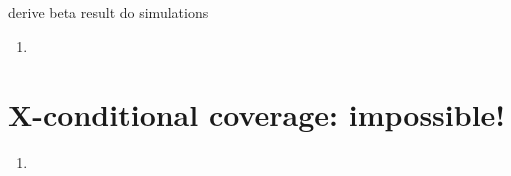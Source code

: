\documentclass{article}
\begin{document}
derive beta result do simulations

\begin{enumerate}[label=(\alph*)]
\item
  \marginpar{\small [2 pts]}
\end{enumerate}

\section{X-conditional coverage: impossible!}

\begin{enumerate}[label=(\alph*)]
\item
  \marginpar{\small [2 pts]}
\end{enumerate}


\section{}



\end{document}

